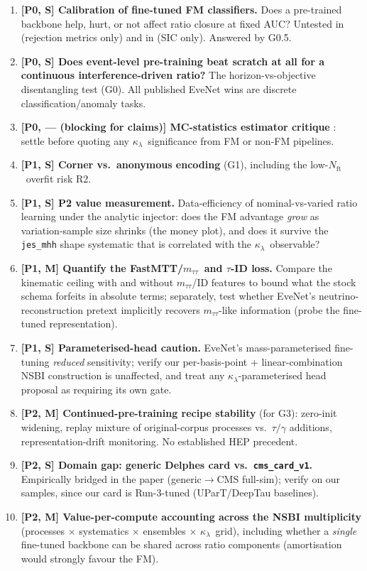 \documentclass[11pt]{article}
\newcommand{\kl}{\ensuremath{\kappa_\lambda}}
\newcommand{\Nft}{\ensuremath{N_{\mathrm{ft}}}}
\newcommand{\mtt}{\ensuremath{m_{\tau\tau}}}
\begin{document}
\begin{enumerate}[label=\textbf{Q\arabic*}.]
\item \textbf{[P0, S] Calibration of fine-tuned FM classifiers.} Does a
  pre-trained backbone help, hurt, or not affect ratio closure at fixed
  AUC? Untested in \cite{Elsharkawy:2026} (rejection metrics only) and in
  \cite{Hsu:2026evenet} (SIC only). Answered by G0.5.
\item \textbf{[P0, S] Does event-level pre-training beat scratch at all
  for a continuous interference-driven ratio?} The
  horizon-vs-objective disentangling test (G0). All published EveNet wins
  are discrete classification/anomaly tasks.
\item \textbf{[P0, --- (blocking for claims)] MC-statistics estimator
  critique} \cite{Shyamsundar:2025}: settle before quoting any
  \kl\ significance from FM or non-FM pipelines.
\item \textbf{[P1, S] Corner vs.\ anonymous encoding} (G1), including the
  low-\Nft\ overfit risk R2.
\item \textbf{[P1, S] P2 value measurement.} Data-efficiency of
  nominal-vs-varied ratio learning under the analytic injector: does the FM
  advantage \emph{grow} as variation-sample size shrinks (the money plot),
  and does it survive the \texttt{jes\_mhh} shape systematic that is
  correlated with the \kl\ observable?
\item \textbf{[P1, M] Quantify the FastMTT/\mtt\ and $\tau$-ID loss.}
  Compare the kinematic ceiling with and without \mtt/ID features to bound
  what the stock schema forfeits in absolute terms; separately, test
  whether EveNet's neutrino-reconstruction pretext implicitly recovers
  \mtt-like information (probe the fine-tuned representation).
\item \textbf{[P1, S] Parameterised-head caution.} EveNet's
  mass-parameterised fine-tuning \emph{reduced} sensitivity; verify our
  per-basis-point + linear-combination NSBI construction is unaffected, and
  treat any \kl-parameterised head proposal as requiring its own gate.
\item \textbf{[P2, M] Continued-pre-training recipe stability} (for G3):
  zero-init widening, replay mixture of original-corpus processes vs.\
  $\tau/\gamma$ additions, representation-drift monitoring. No established
  HEP precedent.
\item \textbf{[P2, S] Domain gap: generic Delphes card vs.\
  \texttt{cms\_card\_v1}.} Empirically bridged in the paper
  (generic$\to$CMS full-sim); verify on our samples, since our card is
  Run-3-tuned (UParT/DeepTau baselines).
\item \textbf{[P2, M] Value-per-compute accounting across the NSBI
  multiplicity} (processes $\times$ systematics $\times$ ensembles
  $\times$ \kl\ grid), including whether a \emph{single} fine-tuned
  backbone can be shared across ratio components (amortisation would
  strongly favour the FM).
\end{enumerate}
\end{document}
